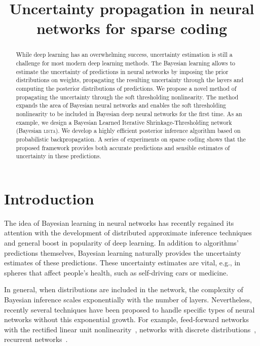 \documentclass{article}
\title{Uncertainty propagation in neural networks for sparse coding}
\author{} %
\begin{document}
\maketitle

\begin{abstract}
While deep learning has an overwhelming success, uncertainty estimation is still a challenge for most modern deep learning methods. The Bayesian learning allows to estimate the uncertainty of predictions in neural networks by imposing the prior distributions on weights, propagating the resulting uncertainty through the layers and computing the posterior distributions of predictions. We propose a novel method of propagating the uncertainty through the soft thresholding nonlinearity. The method expands the area of Bayesian neural networks and enables the soft thresholding nonlinearity to be included in Bayesian deep neural networks for the first time. As an example, we design a Bayesian Learned Iterative Shrinkage-Thresholding network (Bayesian \textsc{lista}). We develop a highly efficient posterior inference algorithm based on probabilistic backpropagation. A series of experiments on sparse coding shows that the proposed framework provides both accurate predictions and sensible estimates of uncertainty in these predictions.
\end{abstract}

\section{Introduction}
The idea of Bayesian learning in neural networks \cite{neal2012bayesian} has recently regained its attention with the development of distributed approximate inference techniques \cite{li2015stochastic, hoffman2013stochastic} and general boost in popularity of deep learning. In addition to algorithms' predictions themselves, Bayesian learning naturally provides the uncertainty estimates of these predictions. These uncertainty estimates are vital, e.g., in spheres that affect people's health, such as self-driving cars or medicine.

In general, when distributions are included in the network, the complexity of Bayesian inference scales exponentially with the number of layers. Nevertheless, recently several techniques have been proposed to handle specific types of neural networks without this exponential growth. For example, feed-forward networks with the rectified linear unit nonlinearity~\cite{hernandez2015probabilistic}, networks with discrete distributions~\cite{soudry2014expectation}, recurrent networks~\cite{mcdermott2017bayesian}.
\end{document}
